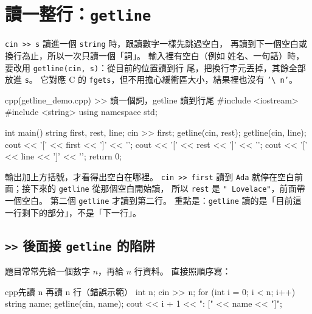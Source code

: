 \section{讀一整行：\texttt{getline}}
\label{sec:getline}

\texttt{cin >> s} 讀進一個 \texttt{string} 時，跟讀數字一樣先跳過空白，
再讀到下一個空白或換行為止，所以一次只讀一個「詞」。 輸入裡有空白（例如
姓名、一句話）時，要改用 \texttt{getline(cin, s)}：從目前的位置讀到行
尾，把換行字元丟掉，其餘全部放進 \texttt{s}。 它對應 C 的
\texttt{fgets}，但不用擔心緩衝區大小，結果裡也沒有 \texttt{'\textbackslash
n'}。

\begin{example}[label=ex:getline-demo]{cpp}{(getline\_demo.cpp) >> 讀一個詞，getline 讀到行尾}
#include <iostream>
#include <string>
using namespace std;

int main() {
    string first, rest, line;
    cin >> first;
    getline(cin, rest);
    getline(cin, line);
    cout << '[' << first << ']' << '\n';
    cout << '[' << rest << ']' << '\n';
    cout << '[' << line << ']' << '\n';
    return 0;
}
\end{example}


輸出加上方括號，才看得出空白在哪裡。 \texttt{cin >> first} 讀到
\texttt{Ada} 就停在空白前面；接下來的 \texttt{getline} 從那個空白開始讀，
所以 \texttt{rest} 是 \texttt{" Lovelace"}，前面帶一個空白。 第二個
\texttt{getline} 才讀到第二行。 重點是：\texttt{getline} 讀的是「目前這
一行剩下的部分」，不是「下一行」。

\subsection{\texttt{>>} 後面接 \texttt{getline} 的陷阱}

題目常常先給一個數字 $n$，再給 $n$ 行資料。 直接照順序寫：

\begin{code}{cpp}{先讀 n 再讀 n 行（錯誤示範）}
int n;
cin >> n;
for (int i = 0; i < n; i++) {
    string name;
    getline(cin, name);
    cout << i + 1 << ": [" << name << "]\n";
}
\end{code}

